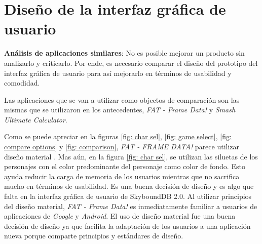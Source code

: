 \section{Diseño de la interfaz gráfica de usuario}
\textbf{Análisis de aplicaciones similares}: No es posible mejorar un producto sin analizarlo y criticarlo. Por ende, es necesario comparar el diseño del prototipo del interfaz gráfica de usuario para así mejorarlo en términos de usabilidad y comodidad.

Las aplicaciones que se van a utilizar como objectos de comparación son las mismas que se utilizaron en los antecedentes, \textit{FAT - Frame Data!} y \textit{Smash Ultimate Calculator}.

Como se puede apreciar en la figuras \ref{fig: char sel}, \ref{fig: game select}, \ref{fig: compare options} y \ref{fig: comparison}, \textit{FAT - FRAME DATA!} parece utilizar diseño material \cite{noauthor_designing_nodate}. Mas aún, en la figura \ref{fig: char sel}, se utilizan las siluetas de los personajes con el color predominante del personaje como color de fondo. Esto ayuda reducir la carga de memoria de los usuarios mientras que no sacrifica mucho en términos de usabilidad. Es una buena decisión de diseño y es algo que falta en la interfaz gráfica de usuario de SkyboundDB 2.0. Al utilizar principios del diseño material, \textit{FAT - Frame Data!} es inmediatamente familiar a usuarios de aplicaciones de \textit{Google} y \textit{Android}. El uso de diseño material fue una buena decisión de diseño ya que facilita la adaptación de los usuarios a una aplicación nueva porque comparte principios y estándares de diseño.

